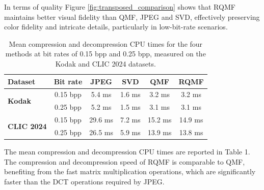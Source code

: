 \documentclass[lettersize,journal]{IEEEtran}
\begin{document}
\noindent In terms of quality Figure \ref{fig:transposed_comparison}  shows that RQMF maintains better visual fidelity than QMF, JPEG and SVD, effectively preserving color fidelity and intricate details, particularly in low-bit-rate scenarios. 
\begin{table}[h!]
\centering
\caption{Mean compression and decompression CPU times for the four methods at bit rates of 0.15 bpp and 0.25 bpp, measured on the Kodak and CLIC 2024 datasets.}
\begin{tabular}{l |c | c c c c}
\toprule
\textbf{Dataset} &
\textbf{Bit rate} &
\textbf{JPEG} &
\textbf{SVD} &
\textbf{QMF} &
\textbf{RQMF} \\
\midrule

\multirow{2}{*}{\textbf{Kodak}}
& 0.15 bpp & 5.4 ms & 1.6 ms & 3.2 ms & 3.2 ms \\
& 0.25 bpp & 5.2 ms & 1.5 ms & 3.1 ms & 3.1 ms \\

\midrule

\multirow{2}{*}{\textbf{CLIC 2024}}
& 0.15 bpp & 29.6 ms & 7.2 ms & 15.2 ms & 14.9 ms \\
& 0.25 bpp & 26.5 ms & 5.9 ms & 13.9 ms & 13.8 ms \\

\bottomrule
\end{tabular}
\end{table}

\noindent  The mean compression and decompression CPU times are reported  in Table 1. The compression and decompression speed of RQMF is comparable to QMF, benefiting from the fast matrix multiplication operations, which are significantly faster than the  DCT operations required by JPEG.

\end{document}
